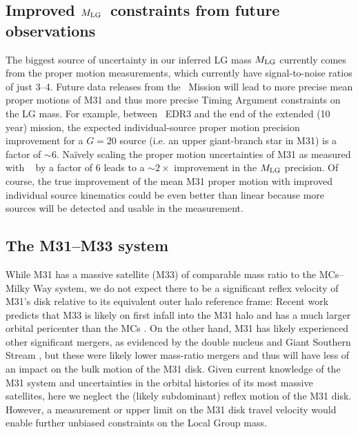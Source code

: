 \documentclass[twocolumn]{aastex631}
\newcommand{\mlg}{\ensuremath{M_{\rm LG}}}
\begin{document}
\subsection{Improved \mlg\ constraints from future observations}

The biggest source of uncertainty in our inferred LG mass $\mlg$ currently comes
from the proper motion measurements, which currently have signal-to-noise ratios
of just 3--4.
Future data releases from the \gaia\ Mission \citep{GaiaOverview2016} will lead
to more precise mean proper motions of M31 and thus more precise Timing Argument
constraints on the LG mass.
For example, between \gaia\ EDR3 and the end of the extended (10 year) mission,
the expected individual-source proper motion precision improvement for a $G=20$
source (i.e. an upper giant-branch star in M31) is a factor of $\sim$6.
Na\"ively scaling the proper motion uncertainties of M31 as measured with \gaia\
\citep{Salomon2021} by a factor of 6 leads to a $\sim2\times$ improvement in the
$\mlg$ precision.
Of course, the true improvement of the mean M31 proper motion with improved
individual source kinematics could be even better than linear because more
sources will be detected and usable in the measurement.


\subsection{The M31--M33 system}

While M31 has a massive satellite (M33) of comparable mass ratio to the
MCs--Milky Way system, we do not expect there to be a significant reflex
velocity of M31's disk relative to its equivalent outer halo reference frame:
Recent work predicts that M33 is likely on first infall into the M31 halo and
has a much larger orbital pericenter than the MCs \citep[e.g.,][]{Patel2017a}.
On the other hand, M31 has likely experienced other significant mergers, as
evidenced by the double nucleus and Giant Southern Stream
\citep[e.g.][]{Ibata:2001, Font:2006}, but these were likely lower mass-ratio
mergers \citep[e.g.][]{Gilbert:2019, Milo:2022} and thus will have less of an
impact on the bulk motion of the M31 disk.
Given current knowledge of the M31 system and uncertainties in the orbital
histories of its most massive satellites, here we neglect the (likely
subdominant) reflex motion of the M31 disk.
However, a measurement or upper limit on the M31 disk travel velocity would
enable further unbiased constraints on the Local Group mass.
\end{document}
